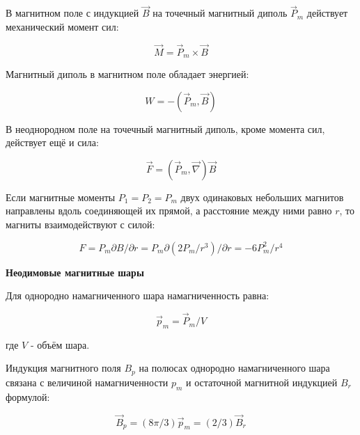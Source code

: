 \documentclass[a4paper, 12pt]{article}
\begin{document}
В магнитном поле с индукцией $\vec{B}$ на точечный магнитный диполь $\vec{P}_{m}$ действует механический момент сил:

 \begin{center}
\begin{equation}
\vec{M}=\vec{P}_{m} \times \vec{B}
\end{equation}
\end{center}
 
 Магнитный диполь в магнитном поле обладает энергией:
  \begin{center}
\begin{equation}
W=-\left(\vec{P}_{m}, \vec{B}\right)
\end{equation}
\end{center}
 
 В неоднородном поле на точечный магнитный диполь, кроме момента сил, действует ещё и сила:
  \begin{center}
\begin{equation}
\vec{F}=\left(\vec{P}_{m}, \vec{\nabla}\right) \vec{B}
\end{equation}
\end{center}

Если магнитные моменты $P_1 = P_2 =P_m$  двух одинаковых небольших магнитов направлены вдоль соединяющей их прямой, а расстояние между ними равно $r$, то магниты взаимодействуют с силой:
  \begin{center}
\begin{equation}
F=P_{m} \partial B / \partial r=P_{m} \partial\left(2 P_{m} / r^{3}\right) / \partial r=-6 P_{m}^{2} / r^{4}
\end{equation}
\end{center}

\textbf{Неодимовые магнитные шары}

Для однородно намагниченного шара намагниченность равна:

  \begin{center}
\begin{equation}
\vec{p}_{m}=\vec{P}_{m} / V
\end{equation}
\end{center}

где $V$ - объём шара.

Индукция магнитного поля $B_p$ на полюсах однородно намагниченного шара связана с величиной намагниченности $p_m$ и остаточной магнитной индукцией $B_r$ формулой:
  \begin{center}
\begin{equation}
\vec{B}_{p}=(8 \pi / 3) \vec{p}_{m}=(2 / 3) \vec{B}_{r}
\end{equation}
\end{center}
\end{document}
